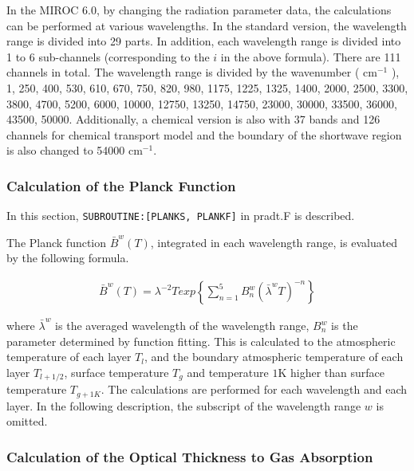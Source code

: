 In the MIROC 6.0, by changing the radiation parameter data, the
calculations can be performed at various wavelengths. In the standard
version, the wavelength range is divided into 29 parts. In addition,
each wavelength range is divided into 1 to 6 sub-channels (corresponding
to the \(i\) in the above formula). There are 111 channels in total. The
wavelength range is divided by the wavenumber ( \(\mathrm{cm}^{-1}\) ),
1, 250, 400, 530, 610, 670, 750, 820, 980, 1175, 1225, 1325, 1400, 2000,
2500, 3300, 3800, 4700, 5200, 6000, 10000, 12750, 13250, 14750, 23000,
30000, 33500, 36000, 43500, 50000. Additionally, a chemical version is
also with 37 bands and 126 channels for chemical transport model and the
boundary of the shortwave region is also changed to 54000
\(\mathrm{cm}^{-1}\).

\hypertarget{calculation-of-the-planck-function}{%
\subsubsection{Calculation of the Planck
Function}\label{calculation-of-the-planck-function}}

In this section, \texttt{SUBROUTINE:{[}PLANKS,\ PLANKF{]}} in pradt.F is
described.

The Planck function \(\bar{B}^{w}(T)\), integrated in each wavelength
range, is evaluated by the following formula.

\begin{eqnarray}
\bar{B}^{w}(T)=\lambda^{-2}{Texp}\left\{\sum_{n=1}^{5} B_{n}^{w}\left(\bar{\lambda}^{w} T\right)^{-n}\right\}
\end{eqnarray}

where \(\bar{\lambda}^{w}\) is the averaged wavelength of the wavelength
range, \(B_{n}^{w}\) is the parameter determined by function fitting.
This is calculated to the atmospheric temperature of each layer \(T_l\),
and the boundary atmospheric temperature of each layer \(T_{l+1/2}\),
surface temperature \(T_g\) and temperature \(1\mathrm{K}\) higher than
surface temperature \(T_{g+1K}\). The calculations are performed for
each wavelength and each layer. In the following description, the
subscript of the wavelength range \(w\) is omitted.

\hypertarget{calculation-of-the-optical-thickness-to-gas-absorption}{%
\subsubsection{Calculation of the Optical Thickness to Gas
Absorption}\label{calculation-of-the-optical-thickness-to-gas-absorption}}

